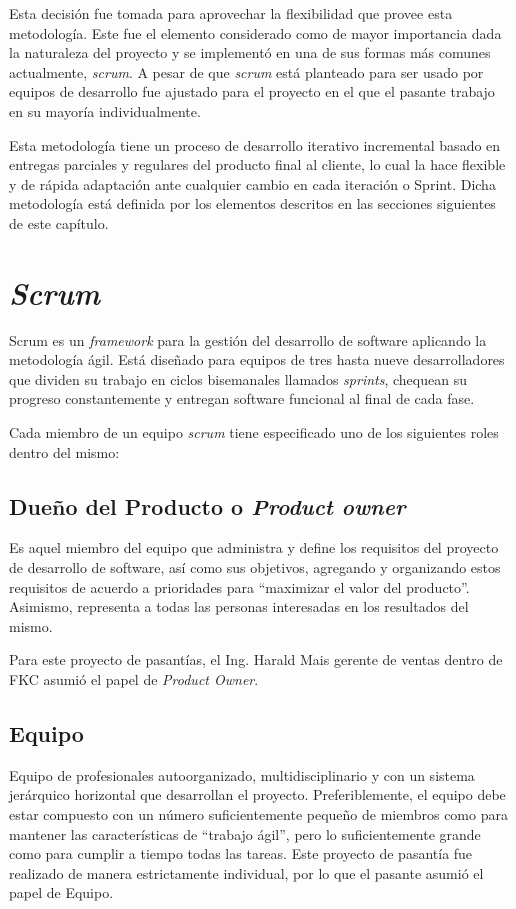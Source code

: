 Esta decisión fue tomada para aprovechar la flexibilidad que provee esta metodología. Este fue el elemento considerado como de mayor importancia dada la naturaleza del proyecto y se implementó en una de sus formas más comunes actualmente, \emph{scrum}. A pesar de que \emph{scrum} está planteado para ser usado por equipos de desarrollo fue ajustado para el proyecto en el que el pasante trabajo en su mayoría individualmente.

Esta metodología tiene un proceso de desarrollo iterativo incremental basado en entregas parciales y regulares del producto final al cliente, lo cual la hace flexible y de rápida adaptación ante cualquier cambio en cada iteración o Sprint. Dicha metodología está definida por los elementos descritos en las secciones siguientes de este capítulo.

\section{\emph{Scrum}}

Scrum es un \emph{framework} para la gestión del desarrollo de software aplicando la metodología ágil. Está diseñado para equipos de tres hasta nueve desarrolladores que dividen su trabajo en ciclos bisemanales llamados \emph{sprints}, chequean su progreso constantemente y entregan software funcional al final de cada fase. \cite{bib:scrum}

Cada miembro de un equipo \emph{scrum} tiene especificado uno de los siguientes roles dentro del mismo:

\subsection{Dueño del Producto o \emph{Product owner}}
Es aquel miembro del equipo que administra y define los requisitos del proyecto de desarrollo de software, así como sus objetivos, agregando y organizando estos requisitos de acuerdo a prioridades para “maximizar el valor del producto”. Asimismo, representa a todas las personas interesadas en los resultados del mismo.

Para este proyecto de pasantías, el Ing. Harald Mais gerente de ventas dentro de \gls{FKC} asumió el papel de \emph{Product Owner}.

\subsection{Equipo}
Equipo de profesionales autoorganizado, multidisciplinario y con un sistema jerárquico horizontal que desarrollan el proyecto. Preferiblemente, el equipo debe estar compuesto con un número suficientemente pequeño de miembros como para mantener las características de “trabajo ágil”, pero lo suficientemente grande como para cumplir a tiempo todas las tareas.
Este proyecto de pasantía fue realizado de manera estrictamente individual, por lo que el pasante asumió el papel de Equipo.

